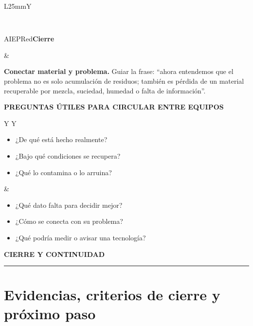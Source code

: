 ﻿\documentclass[10pt,a4paper]{article}
\newcommand{\kicker}[1]{%
  {\color{AIEPRed}\scriptsize\bfseries\MakeUppercase{#1}}\par\vspace{2.5mm}
  {\color{AIEPRed}\rule{13mm}{1.2pt}}\vspace{3mm}
}
\newcommand{\labeltext}[1]{%
  {\scriptsize\bfseries\color{AIEPSlate}\MakeUppercase{#1}}\par\vspace{1.3mm}
}
\newcommand{\pagebreaksection}{\newpage}
\begin{document}
\begin{tabularx}{\textwidth}{L{25mm}Y}
\begin{card}[height=24mm,valign=top]
\end{card}
\\[2mm]
\begin{softcard}[height=24mm,valign=center]{AIEPRed}\centering\bfseries Cierre\end{softcard}
&
\begin{card}[height=24mm,valign=top]
\textbf{Conectar material y problema.} Guiar la frase: ``ahora entendemos que el problema no es solo acumulación de residuos; también es pérdida de un material recuperable por mezcla, suciedad, humedad o falta de información''.
\end{card}
\end{tabularx}

\vspace{4mm}
\begin{card}[height=43mm,valign=top]
\labeltext{Preguntas útiles para circular entre equipos}
\begin{tabularx}{\textwidth}{Y Y}
\begin{itemize}
  \item ¿De qué está hecho realmente?
  \item ¿Bajo qué condiciones se recupera?
  \item ¿Qué lo contamina o lo arruina?
\end{itemize}
&
\begin{itemize}
  \item ¿Qué dato falta para decidir mejor?
  \item ¿Cómo se conecta con su problema?
  \item ¿Qué podría medir o avisar una tecnología?
\end{itemize}
\end{tabularx}
\end{card}

\pagebreaksection

\kicker{Cierre y continuidad}
\section*{Evidencias, criterios de cierre y próximo paso}
\end{document}
